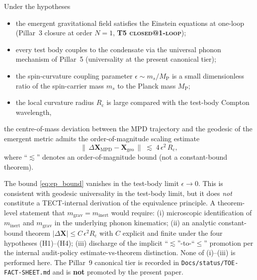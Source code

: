 \begin{proposition}
\label{thm:main}
Under the hypotheses
\begin{itemize}
  \item[(\textbf{H1})] the emergent gravitational field satisfies the
    Einstein equations at one-loop (Pillar~3 closure at order
    $N=1$, \textbf{T5 \textsc{closed@1-loop}});
  \item[(\textbf{H2})] every test body couples to the condensate via
    the universal phonon mechanism of Pillar~5
    (universality at the present canonical tier);
  \item[(\textbf{H3})] the spin-curvature coupling parameter
    $\epsilon \sim m_s / M_{\mathrm{P}}$ is a small dimensionless
    ratio of the spin-carrier mass $m_s$ to the Planck mass
    $M_{\mathrm{P}}$;
  \item[(\textbf{H4})] the local curvature radius $R_{\mathrm{c}}$ is
    large compared with the test-body Compton wavelength,
\end{itemize}
the centre-of-mass deviation between the MPD trajectory and the
geodesic of the emergent metric admits the order-of-magnitude
scaling estimate
\begin{equation}\label{eq:ep_bound}
\boxed{\;
  \big\|\,\Delta\mathbf{X}_{\mathrm{MPD}} - \mathbf{X}_{\mathrm{geo}}
  \,\big\| \;\lesssim\; 4\,\epsilon^2\, R_{\mathrm{c}},
\;}
\end{equation}
where ``$\lesssim$'' denotes an order-of-magnitude bound (not a
constant-bound theorem).
\end{proposition}

\begin{remark}\label{rmk:honest-scope}
The bound \eqref{eq:ep_bound} vanishes in the test-body limit
$\epsilon \to 0$. This is consistent with geodesic universality in
the test-body limit, but it does \emph{not} constitute a
TECT-internal derivation of the equivalence principle. A theorem-
level statement that $m_{\mathrm{grav}} = m_{\mathrm{inert}}$ would
require: (i) microscopic identification of $m_{\mathrm{inert}}$ and
$m_{\mathrm{grav}}$ in the underlying phonon kinematics; (ii) an
analytic constant-bound theorem $|\Delta\mathbf{X}| \leq
C\,\epsilon^2 R_{\mathrm{c}}$ with $C$ explicit and finite under
the four hypotheses (H1)--(H4); (iii) discharge of the implicit
``$\lesssim$''-to-``$\leq$'' promotion per the internal audit-policy
estimate-vs-theorem distinction. None of (i)--(iii) is performed here.
The Pillar~9 canonical tier is recorded in
\texttt{Docs/status/TOE-FACT-SHEET.md} and is \textbf{not} promoted
by the present paper.
\end{remark}

